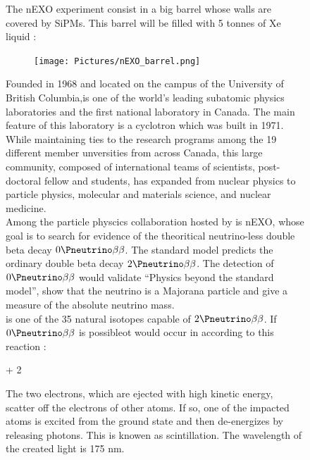 \begin{figure}[!hbtp]
  The nEXO experiment consist in a big barrel whose walls are covered by SiPMs. This barrel will be filled with 5 tonnes of Xe liquid : 
  
  \begin{figure}[!hbtp]
  \centering
  \texttt{[image: Pictures/nEXO\_barrel.png]}
  \label{fig:nEXO_barrel}
  \end{figure}
  

  
  Founded in 1968 and located on the campus of the University of British Columbia,\TR is one of the world’s leading subatomic physics laboratories 
  and the first national laboratory in Canada. The main feature of this laboratory is a cyclotron which was built in 1971. 
  While maintaining ties to the research programs among the 19 different member unversities from across Canada, this large community, composed of 
  international teams of scientists, post-doctoral fellow and students, has expanded from nuclear physics 
  to particle physics, molecular and materials science, and nuclear medicine.
  \\
  
  Among the particle physcics collaboration hosted by \TR is nEXO, whose goal is to search for evidence of the theoritical 
  neutrino-less double beta decay \(0\Pneutrino\beta\beta\). The standard model predicts the ordinary double beta decay \(2\Pneutrino\beta\beta\). The 
  detection of \(0\Pneutrino\beta\beta\) would validate ``Physics beyond the standard model'', show that the neutrino is a Majorana particle and 
  give a measure of the absolute neutrino mass. 
  \\
  
   is one of the 35 natural isotopes capable of \(2\Pneutrino\beta\beta\). If \(0\Pneutrino\beta\beta\) is possibleot would occur in  
  according to this reaction : 
    
     \rightarrow {} + 2\Pelectron %
   
  The two electrons, which are ejected with high kinetic energy, scatter off the electrons of other  atoms. If so, one of the impacted 
  atoms is excited from the ground state and then de-energizes by releasing photons. This is knowen as scintillation. The wavelength of the created light is 175 nm. 
  \\
  

\end{figure}

